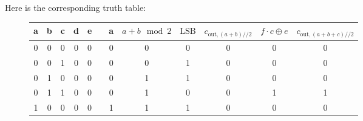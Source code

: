 \documentclass[12pt,a4]{article}
\begin{document}
\begin{enumerate}
\begin{enumerate}
\begin{figure}[H]
        \end{figure}
        Here is the corresponding truth table:
        \begin{figure}[H]
          \centering
          \begin{tabular} {|c|c|c|c|c||c||c|c|c|c|c|c|}
            \hline
            a & b & c & d & e & & a & $a + b \mod 2$ & $\text{LSB}      $ & $c_{\text{out}, (a + b)//2}$ & $f \cdot c \oplus e         $    & $c_{\text{out}, (a + b + c)//2}$ \\
            \hline                                                                                                                         
            0 & 0 & 0 & 0 & 0 & & 0 &              0 &                  0 &                            0 &                                0 &                                0 \\
            \hline                                                                                                                         
            0 & 0 & 1 & 0 & 0 & & 0 &              0 &                  1 &                            0 &                                0 &                                0 \\
            \hline                                                                                                                         
            0 & 1 & 0 & 0 & 0 & & 0 &              1 &                  1 &                            0 &                                0 &                                0 \\
            \hline                                                                                                                         
            0 & 1 & 1 & 0 & 0 & & 0 &              1 &                  0 &                            0 &                                1 &                                1 \\
            \hline                                                                                                                         
            1 & 0 & 0 & 0 & 0 & & 1 &              1 &                  1 &                            0 &                                0 &                                0 \\

\end{tabular}
\end{figure}
\end{enumerate}
\end{enumerate}
\end{document}
